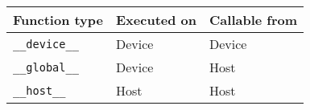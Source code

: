 \begin{tabular}{|l|l|l|}
	\hline
	Function type & Executed on & Callable from \\ \hline
	\texttt{\_\_device\_\_} & Device & Device \\ \hline
	\texttt{\_\_global\_\_} & Device & Host \\ \hline
	\texttt{\_\_host\_\_} & Host & Host \\ \hline
\end{tabular}